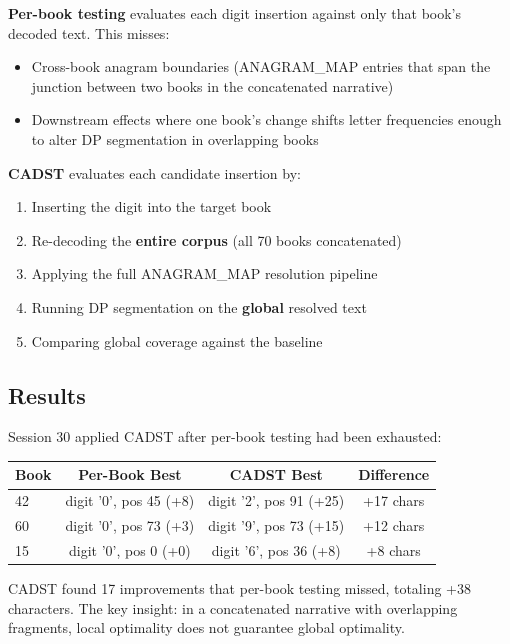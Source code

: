 \documentclass[11pt,a4paper]{article}
\begin{document}
\textbf{Per-book testing} evaluates each digit insertion against only that book's decoded text. This misses:

\begin{itemize}
\item Cross-book anagram boundaries (ANAGRAM\_MAP entries that span the junction between two books in the concatenated narrative)
\item Downstream effects where one book's change shifts letter frequencies enough to alter DP segmentation in overlapping books
\end{itemize}

\textbf{CADST} evaluates each candidate insertion by:
\begin{enumerate}
\item Inserting the digit into the target book
\item Re-decoding the \textbf{entire corpus} (all 70 books concatenated)
\item Applying the full ANAGRAM\_MAP resolution pipeline
\item Running DP segmentation on the \textbf{global} resolved text
\item Comparing global coverage against the baseline
\end{enumerate}

\subsection{Results}

Session 30 applied CADST after per-book testing had been exhausted:

\begin{table}[h]
\centering
\begin{tabular}{lccc}
\toprule
\textbf{Book} & \textbf{Per-Book Best} & \textbf{CADST Best} & \textbf{Difference} \\
\midrule
42 & digit '0', pos 45 (+8) & digit '2', pos 91 (+25) & +17 chars \\
60 & digit '0', pos 73 (+3) & digit '9', pos 73 (+15) & +12 chars \\
15 & digit '0', pos 0 (+0) & digit '6', pos 36 (+8) & +8 chars \\
\bottomrule
\end{tabular}
\end{table}

CADST found 17 improvements that per-book testing missed, totaling +38 characters. The key insight: in a concatenated narrative with overlapping fragments, local optimality does not guarantee global optimality.
\end{document}
